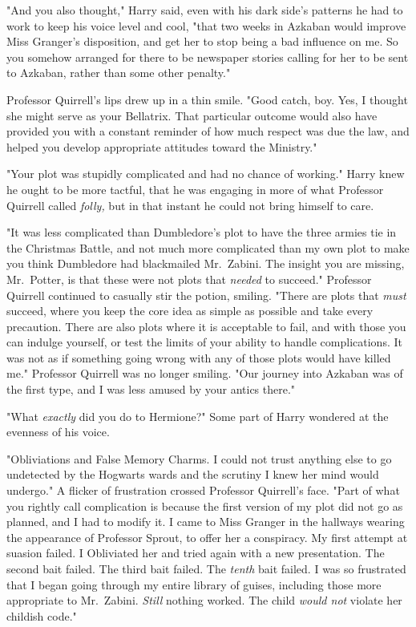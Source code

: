 "And you also thought," Harry said, even with his dark side's patterns he had
to work to keep his voice level and cool, "that two weeks in Azkaban would
improve Miss Granger's disposition, and get her to stop being a bad influence
on me. So you somehow arranged for there to be newspaper stories calling for
her to be sent to Azkaban, rather than some other penalty."

Professor Quirrell's lips drew up in a thin smile. "Good catch, boy. Yes, I
thought she might serve as your Bellatrix. That particular outcome would also
have provided you with a constant reminder of how much respect was due the law,
and helped you develop appropriate attitudes toward the Ministry."

"Your plot was stupidly complicated and had no chance of working." Harry knew
he ought to be more tactful, that he was engaging in more of what Professor
Quirrell called \emph{folly,} but in that instant he could not bring himself to
care.

"It was less complicated than Dumbledore's plot to have the three armies tie in
the Christmas Battle, and not much more complicated than my own plot to make
you think Dumbledore had blackmailed Mr.~Zabini. The insight you are missing,
Mr.~Potter, is that these were not plots that \emph{needed} to succeed."
Professor Quirrell continued to casually stir the potion, smiling. "There are
plots that \emph{must} succeed, where you keep the core idea as simple as
possible and take every precaution. There are also plots where it is acceptable
to fail, and with those you can indulge yourself, or test the limits of your
ability to handle complications. It was not as if something going wrong with
any of those plots would have killed me." Professor Quirrell was no longer
smiling. "Our journey into Azkaban was of the first type, and I was less amused
by your antics there."

"What \emph{exactly} did you do to Hermione?" Some part of Harry wondered at
the evenness of his voice.

"Obliviations and False Memory Charms. I could not trust anything else to go
undetected by the Hogwarts wards and the scrutiny I knew her mind would
undergo." A flicker of frustration crossed Professor Quirrell's face. "Part of
what you rightly call complication is because the first version of my plot did
not go as planned, and I had to modify it. I came to Miss Granger in the
hallways wearing the appearance of Professor Sprout, to offer her a conspiracy.
My first attempt at suasion failed. I Obliviated her and tried again with a new
presentation. The second bait failed. The third bait failed. The \emph{tenth}
bait failed. I was so frustrated that I began going through my entire library
of guises, including those more appropriate to Mr.~Zabini. \emph{Still} nothing
worked. The child \emph{would not} violate her childish code."

